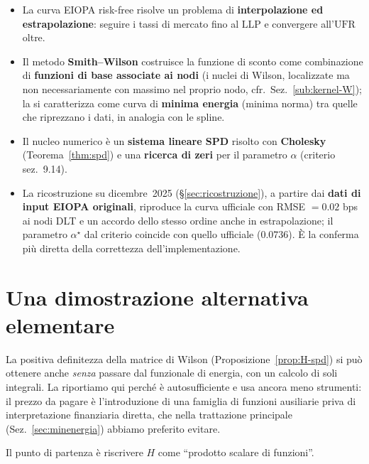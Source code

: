 \documentclass[11pt,a4paper]{article}
\theoremstyle{plain}
\theoremstyle{definition}
\theoremstyle{remark}
\newcommand{\UFR}{\ensuremath{\mathrm{UFR}}}
\newcommand{\LLP}{\ensuremath{\mathrm{LLP}}}
\begin{document}
\begin{itemize}
  \item La curva EIOPA risk-free risolve un problema di \textbf{interpolazione ed
        estrapolazione}: seguire i tassi di mercato fino al $\LLP$ e convergere all'$\UFR$ oltre.
  \item Il metodo \textbf{Smith--Wilson} costruisce la funzione di sconto come combinazione di
        \textbf{funzioni di base associate ai nodi} (i nuclei di Wilson, localizzate ma non
        necessariamente con massimo nel proprio nodo, cfr.~Sez.~\ref{sub:kernel-W}); la si
        caratterizza come curva di \textbf{minima energia} (minima norma) tra quelle che
        riprezzano i dati, in analogia con le spline.
  \item Il nucleo numerico \`e un \textbf{sistema lineare SPD} risolto con \textbf{Cholesky}
        (Teorema~\ref{thm:spd}) e una \textbf{ricerca di zeri} per il parametro $\alpha$
        (criterio sez.~9.14).
  \item La ricostruzione su dicembre~2025 (§\ref{sec:ricostruzione}), a partire dai \textbf{dati
        di input EIOPA originali}, riproduce la curva ufficiale con RMSE $= 0.02$ bps ai nodi DLT
        e un accordo dello stesso ordine anche in estrapolazione; il parametro $\alpha^\star$ dal
        criterio coincide con quello ufficiale ($0.0736$). \`E la conferma pi\`u diretta della
        correttezza dell'implementazione.
\end{itemize}

\appendix
\section{Una dimostrazione alternativa elementare}
\label{app:prova-elementare}

La positiva definitezza della matrice di Wilson (Proposizione~\ref{prop:H-spd}) si pu\`o
ottenere anche \emph{senza} passare dal funzionale di energia, con un calcolo di soli
integrali. La riportiamo qui perch\'e \`e autosufficiente e usa ancora meno strumenti: il
prezzo da pagare \`e l'introduzione di una famiglia di funzioni ausiliarie priva di
interpretazione finanziaria diretta, che nella trattazione principale
(Sez.~\ref{sec:minenergia}) abbiamo preferito evitare.

Il punto di partenza \`e riscrivere $H$ come ``prodotto scalare di funzioni''.
\end{document}
